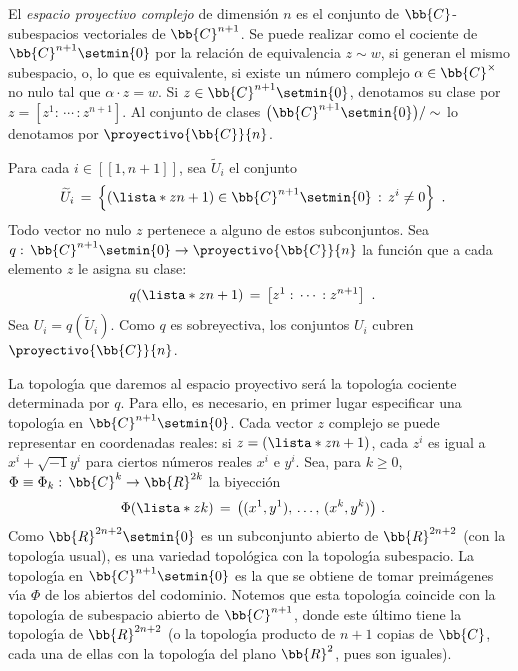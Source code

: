 \begin{ejemplo}
	El \emph{espacio proyectivo complejo} de dimensi\'{o}n $n$ es el
	conjunto de $\bb{C}$-subespacios vectoriales de $\bb{C}^{n+1}$. Se
	puede realizar como el cociente de $\bb{C}^{n+1}\setmin\{0\}$
	por la relaci\'{o}n de equivalencia $z\sim w$, si generan el mismo
	subespacio, o, lo que es equivalente, si existe un n\'{u}mero
	complejo $\alpha\in\bb{C}^{\times}$ no nulo tal que $\alpha\cdot z=w$.
	Si $z\in\bb{C}^{n+1}\setmin\{0\}$, denotamos su clase por
	$z=[z^{1}:\,\cdots\,:z^{n+1}]$. Al conjunto de clases
	$\big(\bb{C}^{n+1}\setmin\{0\}\big)/\sim$ lo denotamos por
	$\proyectivo{\bb{C}}{n}$.

	Para cada $i\in[\![1,n+1]\!]$, sea $\widetilde{U}_{i}$ el conjunto
	\begin{align*}
		\widetilde{U}_{i} & \,=\,\left\lbrace
			(\lista*{z}{n+1})\in\bb{C}^{n+1}\setmin\{0\}\,:\,
			z^{i}\not =0\right\rbrace
		\text{ .}
	\end{align*}
	Todo vector no nulo $z$ pertenece a alguno de estos subconjuntos.
	Sea $q:\,\bb{C}^{n+1}\setmin\{0\}\rightarrow\proyectivo{\bb{C}}{n}$
	la funci\'{o}n que a cada elemento $z$ le asigna su clase:
	\begin{align*}
		q(\lista*{z}{n+1}) & \,=\,\left[z^{1}:\,\cdots\,:z^{n+1}\right]
		\text{ .}
	\end{align*}
	Sea $U_{i}=q(\widetilde{U}_{i})$. Como $q$ es sobreyectiva, los
	conjuntos $U_{i}$ cubren $\proyectivo{\bb{C}}{n}$.

	La topolog\'{\i}a que daremos al espacio proyectivo ser\'{a} la
	topolog\'{\i}a cociente determinada por $q$. Para ello, es necesario,
	en primer lugar especificar una topolog\'{\i}a en
	$\bb{C}^{n+1}\setmin\{0\}$. Cada vector $z$ complejo se puede
	representar en coordenadas reales: si $z=(\lista*{z}{n+1})$, cada
	$z^{i}$ es igual a $x^{i}+\sqrt{-1}y^{i}$ para ciertos n\'{u}meros
	reales $x^{i}$ e $y^{i}$. Sea, para $k\geq 0$, $\Phi\equiv%
	\Phi_{k}:\,\bb{C}^{k}\rightarrow\bb{R}^{2k}$ la biyecci\'{o}n
	\begin{align*}
		\Phi(\lista*{z}{k}) & \,=\,\big( (x^{1},y^{1}),\,\dots,\,
			(x^{k},y^{k})\big)
		\text{ .}
	\end{align*}
	Como $\bb{R}^{2n+2}\setmin\{0\}$ es un subconjunto abierto de
	$\bb{R}^{2n+2}$ (con la topolog\'{\i}a usual), es una variedad
	topol\'{o}gica con la topolog\'{\i}a subespacio. La topolog\'{\i}a
	en $\bb{C}^{n+1}\setmin\{0\}$ es la que se obtiene de tomar
	preim\'{a}genes v\'{\i}a $\Phi$ de los abiertos del codominio.
	Notemos que esta topolog\'{\i}a coincide con la topolog\'{\i}a de
	subespacio abierto de $\bb{C}^{n+1}$, donde este \'{u}ltimo tiene
	la topolog\'{\i}a de $\bb{R}^{2n+2}$ (o la topolog\'{\i}a
	producto de $n+1$ copias de $\bb{C}$, cada una de ellas con la
	topolog\'{\i}a del plano $\bb{R}^{2}$, pues son iguales).


\end{ejemplo}
